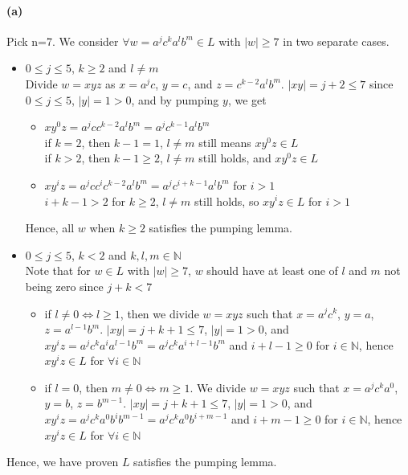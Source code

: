 \documentclass[12pt]{article}
\begin{document}
\paragraph*{(a)} Pick n=7. We consider \(\forall w=a^jc^ka^lb^m \in L\) with \(|w| \geq 7\) in two separate cases.
\begin{itemize}
  \item \(0 \leq j \leq 5\), \(k \geq 2\) and \(l \neq m\)\\
  Divide \(w = xyz\) as \(x = a^jc\), \(y=c\), and \(z=c^{k-2}a^lb^m\). \(|xy| = j+2 \leq 7\) since \(0 \leq j \leq 5\), \(|y| = 1 > 0\), and by pumping \(y\), we get
  \begin{itemize}
    \item \(xy^0z = a^jcc^{k-2}a^lb^m = a^jc^{k-1}a^lb^m\)\\
    if \(k = 2\), then \(k-1 = 1\), \(l \neq m\) still means \(xy^0z \in L\)\\
    if \(k > 2\), then \(k-1 \geq 2\), \(l \neq m\) still holds, and \(xy^0z \in L\)
    \item \(xy^iz = a^jcc^ic^{k-2}a^lb^m = a^jc^{i+k-1}a^lb^m\) for \(i > 1\)\\
    \(i+k-1 > 2\) for \(k \geq 2\), \(l \neq m\) still holds, so \(xy^iz \in L\) for \(i > 1\)
  \end{itemize}
  Hence, all \(w\) when \(k \geq 2\) satisfies the pumping lemma.
  \item \(0 \leq j \leq 5\), \(k < 2\) and \(k, l, m \in \mathbb{N}\)\\
  Note that for \(w \in L\) with \(|w| \geq 7\), \(w\) should have at least one of \(l\) and \(m\) not being zero since \(j+k < 7\)
  \begin{itemize}
    \item if \(l \neq 0 \Leftrightarrow l \geq 1\), then we divide \(w = xyz\) such that \(x=a^jc^k\), \(y=a\), \(z=a^{l-1}b^m\). \(|xy|= j+k+1 \leq 7\), \(|y| = 1>0\), and \(xy^iz = a^jc^ka^ia^{l-1}b^m = a^jc^ka^{i+l-1}b^m\) and \(i+l-1 \geq 0\) for \(i \in \mathbb{N}\), hence \(xy^iz \in L\) for \(\forall i \in \mathbb{N}\)
    \item if \(l = 0\), then \(m \neq 0 \Leftrightarrow m \geq 1\). We divide \(w = xyz\) such that \(x = a^jc^ka^0\), \(y = b\), \(z = b^{m-1}\). \(|xy|= j+k+1 \leq 7\), \(|y| = 1>0\), and \(xy^iz = a^jc^ka^0b^ib^{m-1}= a^jc^ka^0b^{i+m-1}\) and \(i+m-1 \geq 0\) for \(i \in \mathbb{N}\), hence \(xy^iz \in L\) for \(\forall i \in \mathbb{N}\)
  \end{itemize}
\end{itemize}
Hence, we have proven \(L\) satisfies the pumping lemma.
\end{document}
